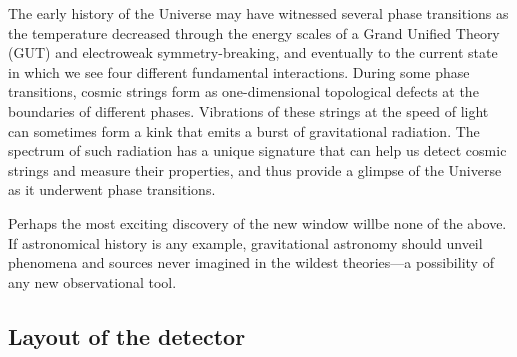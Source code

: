 The early history of the Universe may have witnessed several phase transitions as the temperature decreased through the energy scales of a Grand Unified Theory (GUT) and electroweak symmetry-breaking, and eventually to the current state in which we see four different fundamental interactions. During some phase transitions, cosmic strings form as one-dimensional topological defects at the boundaries of different phases. Vibrations of these strings at the speed of light can sometimes form a kink that emits a burst of gravitational radiation. The spectrum of such radiation has a unique signature that can help us detect cosmic strings and measure their properties, and thus provide a glimpse of the Universe as it underwent phase transitions.

Perhaps the most exciting discovery of the new window willbe none of the above. If astronomical history is any example, gravitational astronomy should unveil phenomena and sources never imagined in the wildest theories---a possibility of any new observational tool.


\FloatBarrier
\newpage
\subsection{Layout of the detector}

